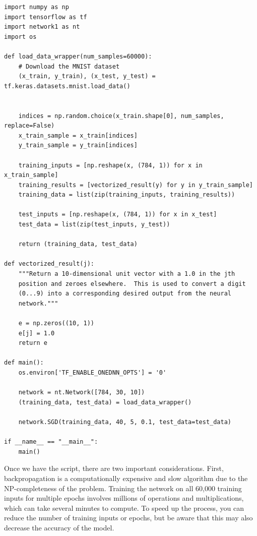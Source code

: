 \documentclass[../main]{subfiles}
\begin{document}
\begin{lstlisting}
import numpy as np
import tensorflow as tf
import network1 as nt
import os

def load_data_wrapper(num_samples=60000):
    # Download the MNIST dataset
    (x_train, y_train), (x_test, y_test) = tf.keras.datasets.mnist.load_data()


    indices = np.random.choice(x_train.shape[0], num_samples, replace=False)
    x_train_sample = x_train[indices]
    y_train_sample = y_train[indices]

    training_inputs = [np.reshape(x, (784, 1)) for x in x_train_sample]
    training_results = [vectorized_result(y) for y in y_train_sample]
    training_data = list(zip(training_inputs, training_results))

    test_inputs = [np.reshape(x, (784, 1)) for x in x_test]
    test_data = list(zip(test_inputs, y_test))

    return (training_data, test_data)

def vectorized_result(j):
    """Return a 10-dimensional unit vector with a 1.0 in the jth
    position and zeroes elsewhere.  This is used to convert a digit
    (0...9) into a corresponding desired output from the neural
    network."""
    
    e = np.zeros((10, 1))
    e[j] = 1.0
    return e

def main():
    os.environ['TF_ENABLE_ONEDNN_OPTS'] = '0'

    network = nt.Network([784, 30, 10])
    (training_data, test_data) = load_data_wrapper()
    
    network.SGD(training_data, 40, 5, 0.1, test_data=test_data)
    
if __name__ == "__main__":
    main()
\end{lstlisting}

Once we have the script, there are two important considerations. First, backpropagation is a computationally expensive and slow algorithm due to the NP-completeness of the problem. Training the network on all 60,000 training inputs for multiple epochs involves millions of operations and multiplications, which can take several minutes to compute. To speed up the process, you can reduce the number of training inputs or epochs, but be aware that this may also decrease the accuracy of the model.
\end{document}
